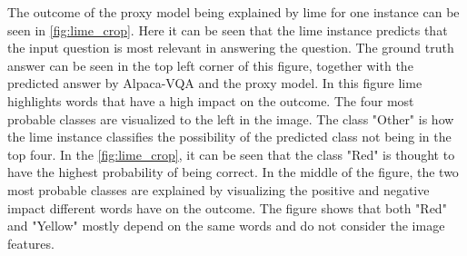     The outcome of the proxy model being explained by \gls{lime} for one instance can be seen in \autoref{fig:lime_crop}. Here it can be seen that the \gls{lime} instance predicts that the input question is most relevant in answering the question. The ground truth answer can be seen in the top left corner of this figure, together with the predicted answer by Alpaca-VQA and the proxy model. In this figure \gls{lime} highlights words that have a high impact on the outcome. The four most probable classes are visualized to the left in the image. The class "Other" is how the \gls{lime} instance classifies the possibility of the predicted class not being in the top four.
    In the \autoref{fig:lime_crop}, it can be seen that the class "Red" is thought to have the highest probability of being correct. In the middle of the figure, the two most probable classes are explained by visualizing the positive and negative impact different words have on the outcome. The figure shows that both "Red" and "Yellow" mostly depend on the same words and do not consider the image features.


